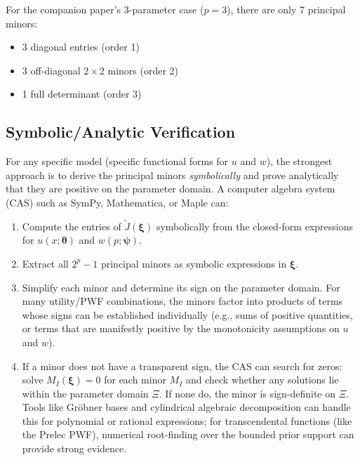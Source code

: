 \documentclass[11pt,a4paper]{article}
\theoremstyle{definition}
\newcommand{\btheta}{\boldsymbol{\theta}}
\newcommand{\bxi}{\boldsymbol{\xi}}
\newcommand{\bpsi}{\boldsymbol{\psi}}
\begin{document}
For the companion paper's 3-parameter case ($p = 3$), there are only
7 principal minors:
\begin{itemize}
    \item 3 diagonal entries (order 1)
    \item 3 off-diagonal $2 \times 2$ minors (order 2)
    \item 1 full determinant (order 3)
\end{itemize}

\subsection{Symbolic/Analytic Verification}
\label{sec:symbolic}

For any specific model (specific functional forms for $u$ and $w$), the
strongest approach is to derive the principal minors \emph{symbolically} and
prove analytically that they are positive on the parameter domain. A computer
algebra system (CAS) such as SymPy, Mathematica, or Maple can:

\begin{enumerate}
    \item Compute the entries of $\widetilde{J}(\bxi)$ symbolically from the
    closed-form expressions for $u(x;\btheta)$ and $w(p;\bpsi)$.

    \item Extract all $2^p - 1$ principal minors as symbolic expressions in
    $\bxi$.

    \item Simplify each minor and determine its sign on the parameter domain.
    For many utility/PWF combinations, the minors factor into products of
    terms whose signs can be established individually (e.g., sums of positive
    quantities, or terms that are manifestly positive by the monotonicity
    assumptions on $u$ and $w$).

    \item If a minor does not have a transparent sign, the CAS can search for
    zeros: solve $M_I(\bxi) = 0$ for each minor $M_I$ and check whether any
    solutions lie within the parameter domain $\Xi$. If none do, the minor is
    sign-definite on $\Xi$. Tools like Gr\"obner bases and cylindrical
    algebraic decomposition can handle this for polynomial or rational
    expressions; for transcendental functions (like the Prelec PWF), numerical
    root-finding over the bounded prior support can provide strong evidence.
\end{enumerate}
\end{document}
